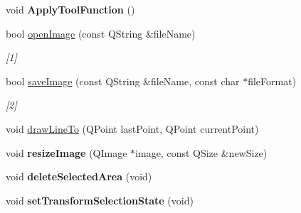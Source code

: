\begin{DoxyCompactItemize}
\item 
\hypertarget{class_scribble_area_a42255c7a44479e447a43bf26e7a89822}{void {\bfseries Apply\-Tool\-Function} ()}\label{class_scribble_area_a42255c7a44479e447a43bf26e7a89822}

\item 
bool \hyperlink{class_scribble_area_afdce32fa1f5d3220987d4983e8a43e1e}{open\-Image} (const Q\-String \&file\-Name)
\begin{DoxyCompactList}\small\item\em \mbox{[}1\mbox{]} \end{DoxyCompactList}\item 
bool \hyperlink{class_scribble_area_a9496b9970942db6abfea836e6bf56ee4}{save\-Image} (const Q\-String \&file\-Name, const char $\ast$file\-Format)
\begin{DoxyCompactList}\small\item\em \mbox{[}2\mbox{]} \end{DoxyCompactList}\item 
void \hyperlink{class_scribble_area_a60cb2e490f094334b8ccb48b636bb67e}{draw\-Line\-To} (Q\-Point last\-Point, Q\-Point current\-Point)
\item 
\hypertarget{class_scribble_area_af968a1bb4a81acf6a2462fd3ecb7c725}{void {\bfseries resize\-Image} (Q\-Image $\ast$image, const Q\-Size \&new\-Size)}\label{class_scribble_area_af968a1bb4a81acf6a2462fd3ecb7c725}

\item 
\hypertarget{class_scribble_area_aefa0ba0130c92343894b2dfefd8374cd}{void {\bfseries delete\-Selected\-Area} (void)}\label{class_scribble_area_aefa0ba0130c92343894b2dfefd8374cd}

\item 
\hypertarget{class_scribble_area_a23a1bc070ce18355bdc91464ec5fd8fe}{void {\bfseries set\-Transform\-Selection\-State} (void)}\label{class_scribble_area_a23a1bc070ce18355bdc91464ec5fd8fe}

\end{DoxyCompactItemize}
